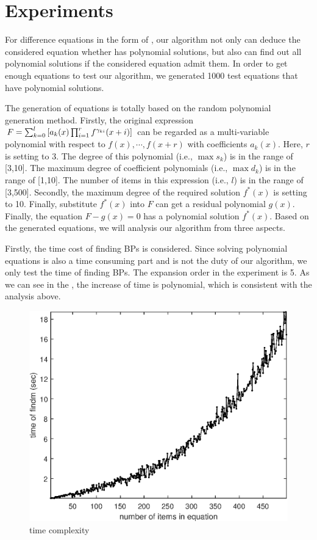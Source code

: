 \section{Experiments} \label{Experiments-02}

For difference equations in the form of , our algorithm not only can deduce the considered equation whether has polynomial solutions, but also can find out all polynomial solutions if the considered equation admit them. In order to get enough equations to test our algorithm, we generated 1000 test equations that have polynomial solutions.

The generation of equations is totally based on the random polynomial generation method. Firstly, the original expression $F=\sum_{k=0}^l{\left[a_k(x)\prod_{i=1}^r{f^{\gamma_{ki}}(x+i)}\right]}$ can be regarded as a multi-variable polynomial with respect to $f(x),\cdots,f(x+r)$ with coefficients $a_k(x)$. Here, $r$ is setting to 3. The degree of this polynomial (i.e., $\max s_k$) is in the range of [3,10]. The maximum degree of coefficient polynomials (i.e., $\max d_k$) is in the range of [1,10]. The number of items in this expression (i.e., $l$) is in the range of [3,500]. Secondly, the maximum degree of the required solution $f^*(x)$ is setting to 10. Finally, substitute $f^*(x)$ into $F$ can get a residual polynomial $g(x)$. Finally, the equation $F-g(x)=0$ has a polynomial solution $f^*(x)$. Based on the generated equations, we will analysis our algorithm from three aspects.

Firstly, the time cost of finding BPs is considered. Since solving polynomial equations is also a time consuming part and is not the duty of our algorithm, we only test the time of finding BPs. The expansion order in the experiment is 5. As we can see in the , the  increase of time is polynomial, which is consistent with the analysis above.
\begin{figure}[H]
\centering
\includegraphics[width=\figwidth]{fig/nlt.eps}
\caption{time complexity}
\label{t-findm}
\end{figure}

